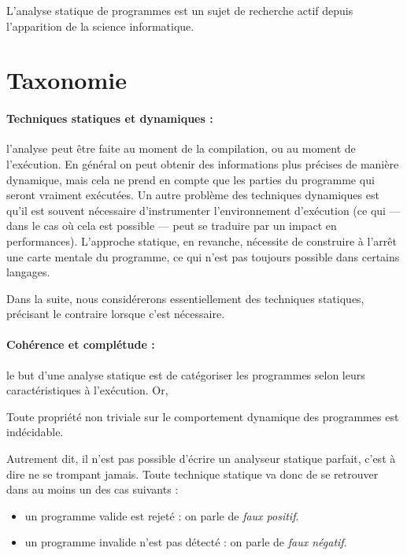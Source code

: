 L'analyse statique de programmes est un sujet de recherche actif depuis
l'apparition de la science informatique.

\section{Taxonomie}

\paragraph{Techniques statiques et dynamiques :} l'analyse peut être faite au
moment de la compilation, ou au moment de l'exécution. En général on peut
obtenir des informations plus précises de manière dynamique, mais cela ne prend
en compte que les parties du programme qui seront vraiment exécutées. Un autre
problème des techniques dynamiques est qu'il est souvent nécessaire
d'instrumenter l'environnement d'exécution (ce qui --- dans le cas où cela est
possible --- peut se traduire par un impact en performances). L'approche
statique, en revanche, nécessite de construire à l'arrêt une carte mentale du
programme, ce qui n'est pas toujours possible dans certains langages.

Dans la suite, nous considérerons essentiellement des techniques statiques,
précisant le contraire lorsque c'est nécessaire.

\paragraph{Cohérence et complétude :} le but d'une analyse statique est de
catégoriser les programmes selon leurs caractéristiques à l'exécution. Or,

\begin{theorem}
  Toute propriété non triviale sur le comportement dynamique des programmes est
  indécidable.
\end{theorem}

Autrement dit, il n'est pas possible d'écrire un analyseur statique parfait,
c'est à dire ne se trompant jamais. Toute technique statique va donc de se
retrouver dans au moins un des cas suivants :

\begin{itemize}
\item
  un programme valide est rejeté : on parle de \emph{faux positif}.
\item
  un programme invalide n'est pas détecté : on parle de
  \emph{faux négatif}.
\end{itemize}

